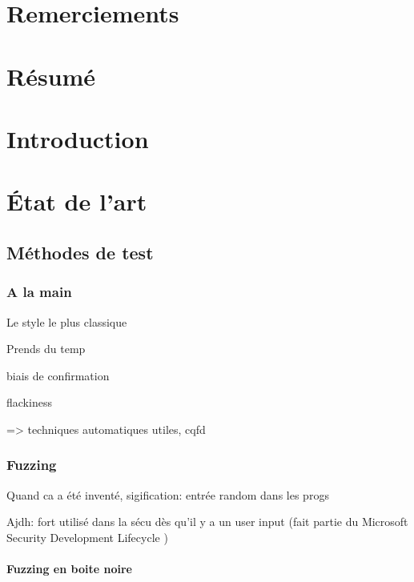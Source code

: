 \documentclass[a4paper]{report}
\begin{document}
\nocite{*}
\chapter{Remerciements}


\chapter{Résumé}

\tableofcontents

\chapter{Introduction}

\chapter{État de l'art}


\section{Méthodes de test}


\subsection{A la main}

Le style le plus classique

Prends du temp

biais de confirmation

flackiness

=> techniques automatiques utiles, cqfd

\subsection{Fuzzing}

Quand ca a été inventé, sigification: entrée random dans les progs \cite{Forrester2000}

Ajdh: fort utilisé dans la sécu dès qu'il y a un user input \cite{Godefroid2020} (fait partie du Microsoft Security Development Lifecycle \cite{howard2006security})

\subsubsection{Fuzzing en boite noire}
\end{document}
